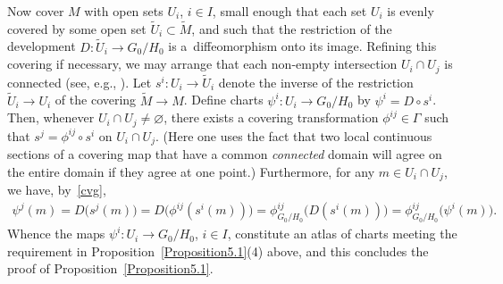 Now cover $M$ with open sets $U_i$, $i \in I$, small enough that each
set $U_i$ is evenly covered by some open set $\tilde U_i \subset
\tilde M$, and such that the restriction of the development $D
\colon \tilde U_i \rightarrow {G_0/H_0}$ is a~dif\/feomorphism onto its
image. Ref\/ining this covering if necessary, we may arrange that each
non-empty intersection $U_i \cap U_j $ is connected (see, e.g., \cite[Theorem~I.5.1]{Bott_Tu_82}). Let $s^i \colon U_i \rightarrow \tilde
U_i$ denote the inverse of the restriction $\tilde U_i \rightarrow
U_i$ of the covering $\tilde M \rightarrow M$. Def\/ine charts $\psi^i
\colon U_i \rightarrow {G_0/H_0}$ by $\psi^i=D \circ s^i$. Then, whenever
$U_i \cap U_j\ne \varnothing $, there exists a covering transformation
$\phi^{ij}\in \Gamma $ such that $s^j=\phi^{ij} \circ s^i$ on $U_i\cap
U_j$. (Here one uses the fact that two local continuous sections of a
covering map that have a common {\em connected} domain will agree on
the entire domain if they agree at one point.) Furthermore, for any $
m \in U_i\cap U_j$, we have, by~\eqref{cvg},
\begin{gather*}
  \psi^j(m)=D\big(s^j(m)\big)=D\big(\phi^{ij}(s^i(m))\big)
  =\phi^{ij}_{G_0/H_0}\big(D(s^i(m))\big)=\phi^{ij}_{G_0/H_0}\big(\psi^i(m)\big).
\end{gather*}
Whence the maps $\psi^i \colon U_i \rightarrow {G_0/H_0}$, $i \in I$,
constitute an atlas of charts meeting the requirement in Proposition~\ref{Proposition5.1}(4) %
above, and this concludes the proof of
Proposition~\ref{Proposition5.1}.
